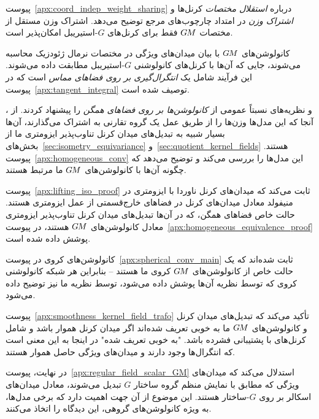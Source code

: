 پیوست~\ref{apx:coord_indep_weight_sharing} درباره \emph{استقلال مختصات} کرنل‌ها و \emph{اشتراک وزن} در امتداد چارچوب‌های مرجع توضیح می‌دهد.
اشتراک وزن مستقل از مختصات $G\mkern-1.4muM$ فقط برای کرنل‌های $G$-استیریبل امکان‌پذیر است.

کانولوشن‌های $G\mkern-1.4muM$ با بیان میدان‌های ویژگی در مختصات نرمال ژئودزیک محاسبه می‌شوند، جایی که آن‌ها با کرنل‌های کانولوشنی $G$-استیریبل مطابقت داده می‌شوند.
این فرآیند شامل یک \emph{انتگرال‌گیری بر روی فضاهای مماس} است که در پیوست~\ref{apx:tangent_integral} توصیف شده است.

\citet{Kondor2018-GENERAL}، \citet{Cohen2019-generaltheory} و \citet{bekkers2020bspline} نظریه‌های نسبتاً عمومی از \emph{کانولوشن‌ها بر روی فضاهای همگن} را پیشنهاد کردند.
از آنجا که این مدل‌ها وزن‌ها را از طریق عمل یک گروه تقارنی به اشتراک می‌گذارند، آن‌ها بسیار شبیه به تبدیل‌های میدان کرنل تناوب‌پذیر ایزومتری ما از بخش‌های~\ref{sec:isometry_equivariance} و~\ref{sec:quotient_kernel_fields} هستند.
پیوست~\ref{apx:homogeneous_conv} این مدل‌ها را بررسی می‌کند و توضیح می‌دهد که چگونه آن‌ها با کانولوشن‌های $G\mkern-1.4muM$ ما مرتبط هستند.

پیوست~\ref{apx:lifting_iso_proof} ثابت می‌کند که میدان‌های کرنل ناوردا با ایزومتری در منیفولد معادل میدان‌های کرنل در فضاهای خارج‌قسمتی از عمل ایزومتری هستند.
حالت خاص فضاهای همگن، که در آن‌ها تبدیل‌های میدان کرنل تناوب‌پذیر ایزومتری معادل کانولوشن‌های $G\mkern-1.4muM$ هستند، در پیوست~\ref{apx:homogeneous_equivalence_proof} پوشش داده شده است.

کانولوشن‌های کروی \citet{Cohen2019-generaltheory} در پیوست~\ref{apx:spherical_conv_main} ثابت شده‌اند که یک حالت خاص از کانولوشن‌های $G\mkern-1.4muM$ کروی ما هستند
-- بنابراین هر شبکه کانولوشنی کروی که توسط نظریه آن‌ها پوشش داده می‌شود، توسط نظریه ما نیز توضیح داده می‌شود.

پیوست~\ref{apx:smoothness_kernel_field_trafo} تأکید می‌کند که تبدیل‌های میدان کرنل و کانولوشن‌های $G\mkern-1.4muM$ ما به خوبی تعریف شده‌اند اگر میدان کرنل هموار باشد و شامل کرنل‌های با پشتیبانی فشرده باشد.
"به خوبی تعریف شده" در اینجا به این معنی است که انتگرال‌ها وجود دارند و میدان‌های ویژگی حاصل هموار هستند.

در نهایت، پیوست~\ref{apx:regular_field_scalar_GM} استدلال می‌کند که میدان‌های ویژگی که مطابق با نمایش منظم گروه ساختار $G$ تبدیل می‌شوند، معادل میدان‌های اسکالر بر روی $G$-ساختار هستند.
این موضوع از آن جهت اهمیت دارد که برخی مدل‌ها، به ویژه کانولوشن‌های گروهی، این دیدگاه را اتخاذ می‌کنند.